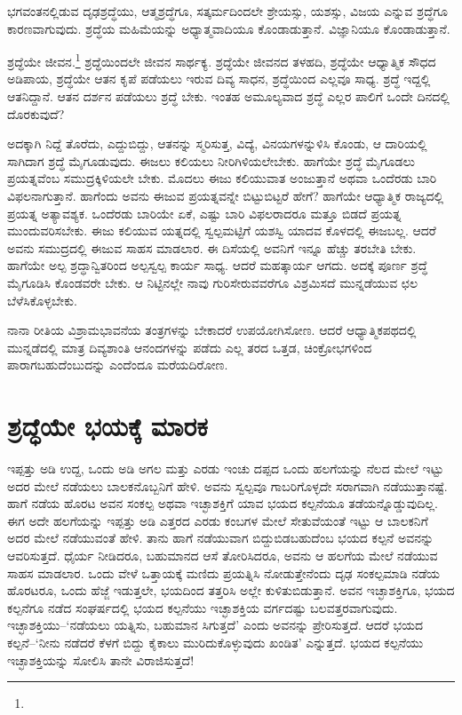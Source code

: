 
ಭಗವಂತನಲ್ಲಿಡುವ ದೃಢಶ್ರದ್ಧೆಯು, ಆತ್ಮಶ್ರದ್ಧೆಗೂ, ಸತ್ಕರ್ಮದಿಂದಲೇ ಶ್ರೇಯಸ್ಸು, ಯಶಸ್ಸು, ವಿಜಯ ಎನ್ನುವ ಶ್ರದ್ಧೆಗೂ ಕಾರಣವಾಗುವುದು. ಶ್ರದ್ಧೆಯ ಮಹಿಮೆಯನ್ನು ಅಧ್ಯಾತ್ಮವಾದಿಯೂ ಕೊಂಡಾಡುತ್ತಾನೆ. ವಿಜ್ಞಾನಿಯೂ ಕೊಂಡಾಡುತ್ತಾನೆ.

ಶ್ರದ್ಧೆಯೇ ಜೀವನ.\footnote{\hfill{}} ಶ್ರದ್ಧೆಯಿಂದಲೇ ಜೀವನ ಸಾರ್ಥಕ್ಯ. ಶ್ರದ್ಧೆಯೇ ಜೀವನದ ತಳಹದಿ, ಶ್ರದ್ಧೆಯೇ ಆಧ್ಯಾತ್ಮಿಕ ಸೌಧದ ಅಡಿಪಾಯ, ಶ್ರದ್ಧೆಯೇ ಆತನ ಕೃಪೆ ಪಡೆಯಲು ಇರುವ ದಿವ್ಯ ಸಾಧನ, ಶ್ರದ್ಧೆಯಿಂದ ಎಲ್ಲವೂ ಸಾಧ್ಯ. ಶ್ರದ್ಧೆ ಇದ್ದಲ್ಲಿ ಆತನಿದ್ದಾನೆ. ಆತನ ದರ್ಶನ ಪಡೆಯಲು ಶ್ರದ್ಧೆ ಬೇಕು. ಇಂತಹ ಅಮೂಲ್ಯವಾದ ಶ್ರದ್ಧೆ ಎಲ್ಲರ ಪಾಲಿಗೆ ಒಂದೇ ದಿನದಲ್ಲಿ ದೊರಕುವುದೆ?

ಅದಕ್ಕಾಗಿ ನಿದ್ದೆ ತೊರೆದು, ಎದ್ದುಬಿದ್ದು, ಆತನನ್ನು ಸ್ಮರಿಸುತ್ತ, ವಿದ್ಯೆ, ವಿನಯಗಳನ್ನುಳಿಸಿ ಕೊಂಡು, ಆ ದಾರಿಯಲ್ಲಿ ಸಾಗಿದಾಗ ಶ್ರದ್ಧೆ ಮೈಗೂಡುವುದು. ಈಜಲು ಕಲಿಯಲು ನೀರಿ\-ಗಿಳಿಯಲೇ\-ಬೇಕು. ಹಾಗೆಯೇ ಶ್ರದ್ಧೆ ಮೈಗೂಡಲು ಪ್ರಯತ್ನವೆಂಬ ಸಮುದ್ರಕ್ಕಿಳಿಯಲೇ ಬೇಕು. ಮೊದಲು ಈಜು ಕಲಿಯುವಾತ ಅಂಜುತ್ತಾನೆ ಅಥವಾ ಒಂದೆರಡು ಬಾರಿ ವಿಫಲನಾಗುತ್ತಾನೆ. ಹಾಗೆಂದು ಅವನು ಈಜುವ ಪ್ರಯತ್ನವನ್ನೇ ಬಿಟ್ಟುಬಿಟ್ಟರೆ ಹೇಗೆ? ಹಾಗೆಯೇ ಆಧ್ಯಾತ್ಮಿಕ ರಾಜ್ಯದಲ್ಲಿ ಪ್ರಯತ್ನ ಅತ್ಯಾವಶ್ಯಕ. ಒಂದೆರಡು ಬಾರಿಯೇ ಏಕೆ, ಎಷ್ಟು ಬಾರಿ ವಿಫಲರಾದರೂ ಮತ್ತೂ ಬಿಡದೆ ಪ್ರಯತ್ನ ಮುಂದುವರಿಸಬೇಕು. ಈಜು ಕಲಿಯುವ ಯತ್ನದಲ್ಲಿ ಸ್ವಲ್ಪಮಟ್ಟಿಗೆ ಯಶಸ್ವಿ ಯಾದವ ಕೊಳದಲ್ಲಿ ಈಜಬಲ್ಲ. ಆದರೆ ಅವನು ಸಮುದ್ರದಲ್ಲಿ ಈಜುವ ಸಾಹಸ ಮಾಡಲಾರ. ಈ ದಿಸೆಯಲ್ಲಿ ಅವನಿಗೆ ಇನ್ನೂ ಹೆಚ್ಚು ತರಬೇತಿ ಬೇಕು. ಹಾಗೆಯೇ ಅಲ್ಪ ಶ್ರದ್ಧಾನ್ವಿತರಿಂದ ಅಲ್ಪಸ್ವಲ್ಪ ಕಾರ್ಯ ಸಾಧ್ಯ. ಆದರೆ ಮಹತ್ಕಾರ್ಯ ಆಗದು. ಅದಕ್ಕೆ ಪೂರ್ಣ ಶ್ರದ್ಧೆ ಮೈಗೂಡಿಸಿ ಕೊಂಡವರೇ ಬೇಕು. ಆ ನಿಟ್ಟಿನಲ್ಲೇ ನಾವು ಗುರಿಸೇರುವವರೆಗೂ ವಿಶ್ರಮಿಸದೆ ಮುನ್ನಡೆಯುವ ಛಲ ಬೆಳೆಸಿಕೊಳ್ಳಬೇಕು.

ನಾನಾ ರೀತಿಯ ವಿಶ್ರಾಮಭಾವನೆಯ ತಂತ್ರಗಳನ್ನು ಬೇಕಾದರೆ ಉಪಯೋಗಿಸೋಣ. ಆದರೆ ಆಧ್ಯಾತ್ಮಿಕಪಥದಲ್ಲಿ ಮುನ್ನಡೆದಲ್ಲಿ ಮಾತ್ರ ದಿವ್ಯಶಾಂತಿ ಆನಂದಗಳನ್ನು ಪಡೆದು ಎಲ್ಲ ತರದ ಒತ್ತಡ, ಚಿಂಕ್ರೋಭಗಳಿಂದ ಪಾರಾಗಬಹುದೆಂಬುದನ್ನು ಎಂದೆಂದೂ ಮರೆಯದಿರೋಣ.


\section*{ಶ್ರದ್ಧೆಯೇ ಭಯಕ್ಕೆ ಮಾರಕ}


ಇಪ್ಪತ್ತು ಅಡಿ ಉದ್ದ, ಒಂದು ಅಡಿ ಅಗಲ ಮತ್ತು ಎರಡು ಇಂಚು ದಪ್ಪದ ಒಂದು ಹಲಗೆಯನ್ನು ನೆಲದ ಮೇಲೆ ಇಟ್ಟು ಅದರ ಮೇಲೆ ನಡೆಯಲು ಬಾಲಕನೊಬ್ಬನಿಗೆ ಹೇಳಿ. ಅವನು ಸ್ವಲ್ಪವೂ ಗಾಬರಿಗೊಳ್ಳದೇ ಸರಾಗವಾಗಿ ನಡೆಯುತ್ತಾನಷ್ಟೆ. ಹಾಗೆ ನಡೆಯ ಹೊರಟ ಅವನ ಸಂಕಲ್ಪ ಅಥವಾ ಇಚ್ಛಾಶಕ್ತಿಗೆ ಯಾವ ಭಯದ ಕಲ್ಪನೆಯೂ ತಡೆಯನ್ನೊಡ್ಡುವುದಿಲ್ಲ. ಈಗ ಅದೇ ಹಲಗೆಯನ್ನು ಇಪ್ಪತ್ತು ಅಡಿ ಎತ್ತರದ ಎರಡು ಕಂಬಗಳ ಮೇಲೆ ಸೇತುವೆಯಂತೆ ಇಟ್ಟು ಆ ಬಾಲಕನಿಗೆ ಅದರ ಮೇಲೆ ನಡೆಯುವಂತೆ ಹೇಳಿ. ತಾನು ಹಾಗೆ ನಡೆಯುವಾಗ ಬಿದ್ದುಬಿಡಬಹುದೆಂಬ ಭಯದ ಕಲ್ಪನೆ ಅವನನ್ನು ಆವರಿಸುತ್ತದೆ. ಧೈರ್ಯ ನೀಡಿದರೂ, ಬಹುಮಾನದ ಆಸೆ ತೋರಿಸಿದರೂ, ಅವನು ಆ ಹಲಗೆಯ ಮೇಲೆ ನಡೆಯುವ ಸಾಹಸ ಮಾಡಲಾರ. ಒಂದು ವೇಳೆ ಒತ್ತಾಯಕ್ಕೆ ಮಣಿದು ಪ್ರಯತ್ನಿಸಿ ನೋಡುತ್ತೇನೆಂದು ದೃಢ ಸಂಕಲ್ಪಮಾಡಿ ನಡೆಯ ಹೊರಟರೂ, ಒಂದು ಹೆಜ್ಜೆ ಇಡುತ್ತಲೇ, ಭಯದಿಂದ ತತ್ತರಿಸಿ ಅಲ್ಲೇ ಕುಳಿತುಬಿಡುತ್ತಾನೆ. ಅವನ ಇಚ್ಛಾಶಕ್ತಿಗೂ, ಭಯದ ಕಲ್ಪನೆಗೂ ನಡೆದ ಸಂಘರ್ಷದಲ್ಲಿ ಭಯದ ಕಲ್ಪನೆಯು ಇಚ್ಛಾಶಕ್ತಿಯ ವರ್ಗದಷ್ಟು ಬಲವತ್ತರವಾಗುವುದು. ಇಚ್ಛಾಶಕ್ತಿಯು–‘ನಡೆಯಲು ಯತ್ನಿಸು, ಬಹುಮಾನ ಸಿಗುತ್ತದೆ’ ಎಂದು ಅವನನ್ನು ಪ್ರೇರಿಸುತ್ತದೆ. ಆದರೆ ಭಯದ ಕಲ್ಪನೆ–‘ನೀನು ನಡೆದರೆ ಕೆಳಗೆ ಬಿದ್ದು ಕೈಕಾಲು ಮುರಿದು\-ಕೊಳ್ಳುವುದು ಖಂಡಿತ’ ಎನ್ನುತ್ತದೆ. ಭಯದ ಕಲ್ಪನೆಯು ಇಚ್ಛಾಶಕ್ತಿಯನ್ನು ಸೋಲಿಸಿ ತಾನೇ ವಿರಾಜಿಸುತ್ತದೆ!

